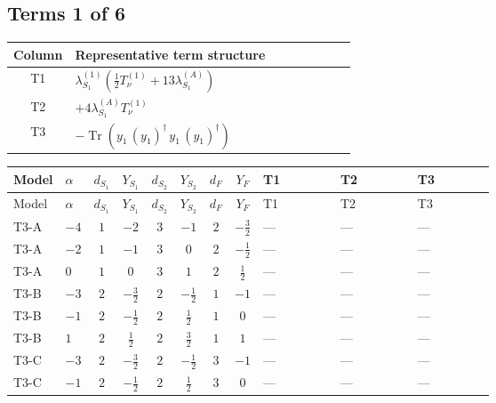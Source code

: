 \documentclass[8pt]{article}
\begin{document}
\begin{landscape}
\subsection*{Terms 1 of 6}
\begin{center}
\begin{tabular}{@{}c >{\raggedright\arraybackslash}p{0.82\linewidth}@{}}
\toprule
Column & Representative term structure \\
\midrule
T1 & \(\displaystyle {\lambda_{S_1}^{(1)}} \left(\frac{1}{2} T_{\nu}^{(1)}+13 {\lambda_{S_1}^{(A)}}\right)\) \\
\midrule
T2 & \(\displaystyle +4 {\lambda_{S_1}^{(A)}} T_{\nu}^{(1)}\) \\
\midrule
T3 & \(\displaystyle -\operatorname{Tr}\!\left({y_1}\,\left({y_1}\right)^{\dagger}\,{y_1}\,\left({y_1}\right)^{\dagger}\right)\) \\
\midrule
\bottomrule
\end{tabular}
\end{center}
\smallskip
\tiny
\begin{longtable}{@{}llcccccc >{\raggedright\arraybackslash}p{0.21\linewidth} >{\raggedright\arraybackslash}p{0.21\linewidth} >{\raggedright\arraybackslash}p{0.21\linewidth}@{}}
\toprule
Model & $\alpha$ & $d_{S_1}$ & $Y_{S_1}$ & $d_{S_2}$ & $Y_{S_2}$ & $d_F$ & $Y_F$ & T1 & T2 & T3 \\
\midrule
\endfirsthead
\toprule
Model & $\alpha$ & $d_{S_1}$ & $Y_{S_1}$ & $d_{S_2}$ & $Y_{S_2}$ & $d_F$ & $Y_F$ & T1 & T2 & T3 \\
\midrule
\endhead
T3-A & $-4$ & $1$ & $-2$ & $3$ & $-1$ & $2$ & $-\frac{3}{2}$ & --- & --- & --- \\
\midrule
T3-A & $-2$ & $1$ & $-1$ & $3$ & $0$ & $2$ & $-\frac{1}{2}$ & --- & --- & --- \\
\midrule
T3-A & $0$ & $1$ & $0$ & $3$ & $1$ & $2$ & $\frac{1}{2}$ & --- & --- & --- \\
\midrule
T3-B & $-3$ & $2$ & $-\frac{3}{2}$ & $2$ & $-\frac{1}{2}$ & $1$ & $-1$ & --- & --- & --- \\
\midrule
T3-B & $-1$ & $2$ & $-\frac{1}{2}$ & $2$ & $\frac{1}{2}$ & $1$ & $0$ & --- & --- & --- \\
\midrule
T3-B & $1$ & $2$ & $\frac{1}{2}$ & $2$ & $\frac{3}{2}$ & $1$ & $1$ & --- & --- & --- \\
\midrule
T3-C & $-3$ & $2$ & $-\frac{3}{2}$ & $2$ & $-\frac{1}{2}$ & $3$ & $-1$ & --- & --- & --- \\
\midrule
T3-C & $-1$ & $2$ & $-\frac{1}{2}$ & $2$ & $\frac{1}{2}$ & $3$ & $0$ & --- & --- & --- \\

\end{longtable}
\end{landscape}
\end{document}
